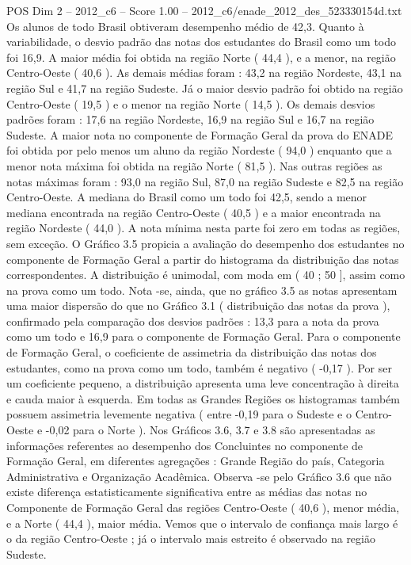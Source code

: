 \begin{textsample}{POS Dim 2 – 2012\_c6 – Score 1.00 – 2012\_c6/enade\_2012\_des\_523330154d.txt}
Os alunos de todo Brasil obtiveram desempenho médio de 42,3.
Quanto à variabilidade, o desvio padrão das notas dos estudantes do Brasil como um todo foi 16,9.
A maior média foi obtida na região Norte ( 44,4 ), e a menor, na região Centro-Oeste ( 40,6 ).
As demais médias foram : 43,2 na região Nordeste, 43,1 na região Sul e 41,7 na região Sudeste.
Já o maior desvio padrão foi obtido na região Centro-Oeste ( 19,5 ) e o menor na região Norte ( 14,5 ).
Os demais desvios padrões foram : 17,6 na região Nordeste, 16,9 na região Sul e 16,7 na região Sudeste.
A maior nota no componente de Formação Geral da prova do ENADE foi obtida por pelo menos um aluno da região Nordeste ( 94,0 ) enquanto que a menor nota máxima foi obtida na região Norte ( 81,5 ).
Nas outras regiões as notas máximas foram : 93,0 na região Sul, 87,0 na região Sudeste e 82,5 na região Centro-Oeste.
A mediana do Brasil como um todo foi 42,5, sendo a menor mediana encontrada na região Centro-Oeste ( 40,5 ) e a maior encontrada na região Nordeste ( 44,0 ).
A nota mínima nesta parte foi zero em todas as regiões, sem exceção.
O Gráfico 3.5 propicia a avaliação do desempenho dos estudantes no componente de Formação Geral a partir do histograma da distribuição das notas correspondentes.
A distribuição é unimodal, com moda em ( 40 ; 50 ], assim como na prova como um todo.
Nota -se, ainda, que no gráfico 3.5 as notas apresentam uma maior dispersão do que no Gráfico 3.1 ( distribuição das notas da prova ), confirmado pela comparação dos desvios padrões : 13,3 para a nota da prova como um todo e 16,9 para o componente de Formação Geral.
Para o componente de Formação Geral, o coeficiente de assimetria da distribuição das notas dos estudantes, como na prova como um todo, também é negativo ( -0,17 ).
Por ser um coeficiente pequeno, a distribuição apresenta uma leve concentração à direita e cauda maior à esquerda.
Em todas as Grandes Regiões os histogramas também possuem assimetria levemente negativa ( entre -0,19 para o Sudeste e o Centro-Oeste e -0,02 para o Norte ).
Nos Gráficos 3.6, 3.7 e 3.8 são apresentadas as informações referentes ao desempenho dos Concluintes no componente de Formação Geral, em diferentes agregações : Grande Região do país, Categoria Administrativa e Organização Acadêmica.
Observa -se pelo Gráfico 3.6 que não existe diferença estatisticamente significativa entre as médias das notas no Componente de Formação Geral das regiões Centro-Oeste ( 40,6 ), menor média, e a Norte ( 44,4 ), maior média.
Vemos que o intervalo de confiança mais largo é o da região Centro-Oeste ; já o intervalo mais estreito é observado na região Sudeste.

\end{textsample}
